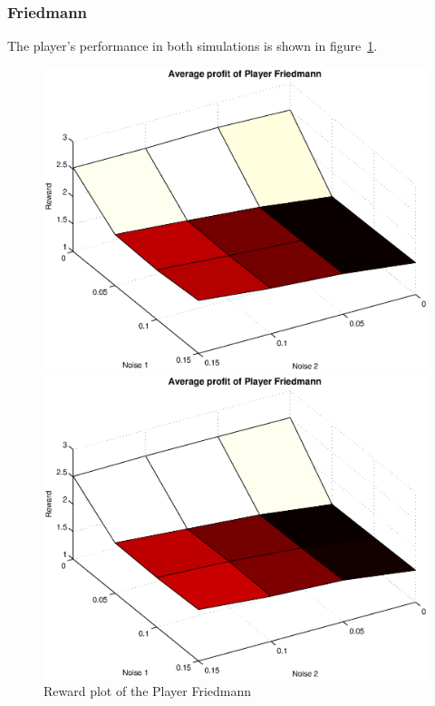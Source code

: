 \subsubsection{Friedmann}
The player's performance in both simulations is shown in figure~\ref{pic player friedmann}.\\
\begin{figure}[h]

\begin{minipage}[hbt]{0.65\textwidth}
	\centering
	\includegraphics[width=\textwidth]{pics/simulation1/Reward_vs_Noise_of_Player_Friedmann}
\end{minipage}
\hfill
\begin{minipage}[hbt]{0.3\textwidth}
	\centering
	\includegraphics[width=\textwidth]{pics/simulation2/Reward_vs_Noise_of_Player_Friedmann}
\end{minipage}
	\caption{Reward plot of the Player Friedmann}
	\label{pic player friedmann}
\end{figure}

